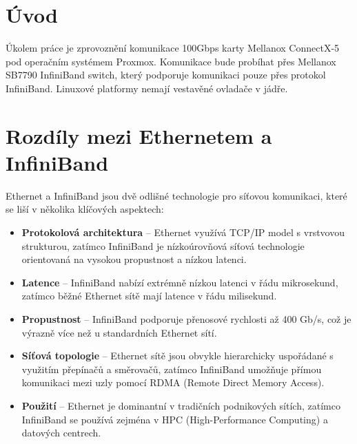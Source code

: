 \newpage
\section{Úvod}
Úkolem práce je zprovoznění komunikace 100Gbps karty Mellanox ConnectX-5 pod operačním systémem Proxmox. Komunikace bude probíhat přes 
Mellanox SB7790 InfiniBand switch, který podporuje komunikaci pouze přes protokol InfiniBand\cite{InfiniBand}. Linuxové platformy nemají vestavěné ovladače v jádře.
\newpage

\section{Rozdíly mezi Ethernetem a InfiniBand}
Ethernet a InfiniBand\cite{InfiniBand} jsou dvě odlišné technologie pro síťovou komunikaci, které se liší v několika klíčových aspektech:
\begin{itemize}
    \item \textbf{Protokolová architektura} – Ethernet využívá TCP/IP model s vrstvovou strukturou, zatímco InfiniBand\cite{InfiniBand} je nízkoúrovňová síťová technologie orientovaná na vysokou propustnost a nízkou latenci.
    \item \textbf{Latence} – InfiniBand\cite{InfiniBand} nabízí extrémně nízkou latenci v řádu mikrosekund, zatímco běžné Ethernet sítě mají latence v řádu milisekund.
    \item \textbf{Propustnost} – InfiniBand\cite{InfiniBand} podporuje přenosové rychlosti až 400 Gb/s, což je výrazně více než u standardních Ethernet sítí.
    \item \textbf{Síťová topologie} – Ethernet sítě jsou obvykle hierarchicky uspořádané s využitím přepínačů a směrovačů, zatímco InfiniBand\cite{InfiniBand} umožňuje přímou komunikaci mezi uzly pomocí RDMA (Remote Direct Memory Access).
    \item \textbf{Použití} – Ethernet je dominantní v tradičních podnikových sítích, zatímco InfiniBand\cite{InfiniBand} se používá zejména v HPC (High-Performance Computing) a datových centrech.
\end{itemize}